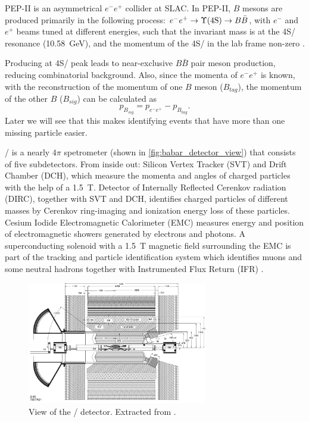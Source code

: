 PEP-II is an asymmetrical $e^- e^+$ collider at SLAC.
In PEP-II, $B$ mesons are produced primarily in the following process:
$e^- e^+ \rightarrow \Y4S/ \rightarrow B \bar{B}$, with
$e^-$ and $e^+$ beams tuned at different energies,
such that the invariant mass is at the \Y4S/ resonance (\SI{10.58}{GeV}),
and the momentum of the \Y4S/ in the lab frame
non-zero \cite{Harrison:1998yr}.

Producing at \Y4S/ peak leads to near-exclusive $B \bar{B}$ pair meson
production, reducing combinatorial background.
Also, since the momenta of $e^- e^+$ is known, with the reconstruction of the
momentum of one $B$ meson ($B_{tag}$), the momentum of the other $B$
($B_{sig}$) can be calculated as
\begin{equation}
    p_{B_{sig}} = p_{e^-e^+} - p_{B_{tag}}.
\end{equation}
Later we will see that this makes identifying events that have more than one
missing particle easier.

\BaBar/ is a nearly $4\pi$ spetrometer (shown in
\autoref{fig:babar_detector_view}) that consists of five subdetectors.
From inside out:
Silicon Vertex Tracker (SVT) and Drift Chamber (DCH), which measure the momenta
and angles of charged particles with the help of a \SI{1.5}{T}.
Detector of Internally Reflected Cerenkov radiation (DIRC), together with SVT
and DCH, identifies charged particles of different masses by Cerenkov
ring-imaging and ionization energy loss of these particles.
Cesium Iodide Electromagnetic Calorimeter (EMC) measures energy and
position of electromagnetic showers generated by electrons and photons.
A superconducting solenoid with a \SI{1.5}{T} magnetic field surrounding the
EMC is part of the tracking and particle identification system which identifies
muons and some neutral hadrons together with Instrumented Flux Return
(IFR) \cite{Lees:2013uzd}.

\begin{figure}[ht]
    \centering
    \includegraphics[width=0.7\textwidth]{figs/babar_detector_view.pdf}
    \caption{
        View of the \BaBar/ detector.
        Extracted from \cite{Boutigny:1995ib}.
    }
    \label{fig:babar_detector_view}
\end{figure}

